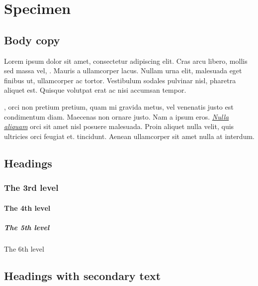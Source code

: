 \documentclass[letterpaper,10pt,english]{sphinxmanual}
\begin{document}
\chapter{Specimen}
\label{\detokenize{specimen:specimen}}\label{\detokenize{specimen::doc}}

\section{Body copy}
\label{\detokenize{specimen:body-copy}}
Lorem ipsum dolor sit amet, consectetur adipiscing elit. Cras arcu
libero, mollis sed massa vel, . Mauris a ullamcorper
lacus. Nullam urna elit, malesuada eget finibus ut, ullamcorper ac
tortor. Vestibulum sodales pulvinar nisl, pharetra aliquet est. Quisque
volutpat erat ac nisi accumsan tempor.

, orci non pretium pretium, quam mi gravida metus, vel
venenatis justo est condimentum diam. Maecenas non ornare justo. Nam a
ipsum eros. {\hyperref[\detokenize{specimen:}]{\emph{Nulla aliquam}}} orci sit amet nisl posuere malesuada.
Proin aliquet nulla velit, quis ultricies orci feugiat et.
 tincidunt. Aenean ullamcorper sit amet
nulla at interdum.


\section{Headings}
\label{\detokenize{specimen:headings}}

\subsection{The 3rd level}
\label{\detokenize{specimen:the-3rd-level}}

\subsubsection{The 4th level}
\label{\detokenize{specimen:the-4th-level}}

\paragraph{The 5th level}
\label{\detokenize{specimen:the-5th-level}}
The 6th level


\section{Headings with secondary text}
\label{\detokenize{specimen:headings-with-secondary-text}}
\end{document}
